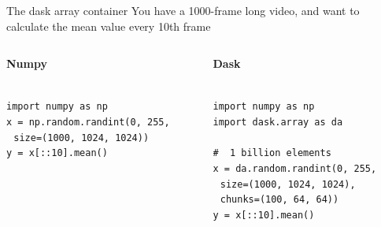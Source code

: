 \documentclass[9pt, aspectratio=169]{beamer}
\begin{document}
\begin{frame}
	{The dask array container}
	You have a 1000-frame long video, and want to calculate the mean value every 10th frame\\
	\vspace{2em}
	\begin{columns}
		\begin{column}[t]{0.5\textwidth}
			\textbf{Numpy}\\
			~\\
			\begin{codebox}
				\texttt{import numpy as np\\
					x = np.random.randint(0, 255,\\
					$~~~$size=(1000, 1024, 1024))\\
					y = x[::10].mean()
				}
			\end{codebox}
		\end{column}
		\begin{column}[t]{0.5\textwidth}
			\textbf{Dask}\\
			~\\
			\begin{codebox}
				\texttt{import numpy as np\\
					import dask.array as da\\
					\\
					\# ~1 billion elements\\
					x = da.random.randint(0, 255,\\
					$~~~$size=(1000, 1024, 1024),\\
					$~~~$chunks=(100, 64, 64))\\
					y = x[::10].mean()
				}
			\end{codebox}
		\end{column}
	\end{columns}
\end{frame}
\end{document}
